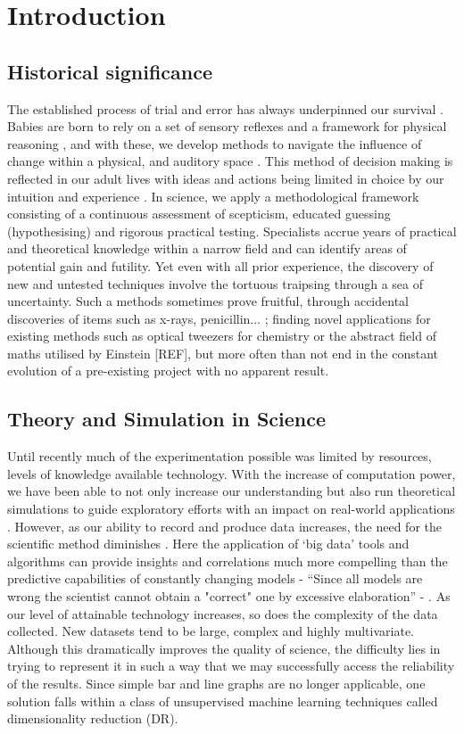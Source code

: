 
\section{Introduction}

\subsection*{Historical significance}
The established process of trial and error has always underpinned our survival \citep{TrialandError}. Babies are born to rely on a set of sensory reflexes and a framework for physical reasoning \citep{pr}, and with these, we develop methods to navigate the influence of change within a physical, and auditory space \citep{objects}. This method of decision making is reflected in our adult lives with ideas and actions being limited in choice by our intuition and experience \citep{descartes}. In science, we apply a methodological framework consisting of a continuous assessment of scepticism, educated guessing (hypothesising) and rigorous practical testing. Specialists accrue years of practical and theoretical knowledge within a narrow field and can identify areas of potential gain and futility. Yet even with all prior experience, the discovery of new and untested techniques involve the tortuous traipsing through a sea of uncertainty. Such a methods sometimes prove fruitful, through accidental discoveries of items such as x-rays, penicillin... \citep{accidental}; finding novel applications for existing methods such as optical tweezers for chemistry or the abstract field of maths utilised by Einstein [REF], but more often than not end in the constant evolution of a pre-existing project with no apparent result. 

\subsection*{Theory and Simulation in Science}

Until recently much of the experimentation possible was limited by resources, levels of knowledge available technology. With the increase of computation power, we have been able to not only increase our understanding but also run theoretical simulations to guide exploratory efforts with an impact on real-world applications \citep{dft,lion,theoreticalbio,drug}. However, as our ability to record and produce data increases, the need for the scientific method diminishes \citep{wired}. Here the application of `big data' tools and algorithms can provide insights and correlations much more compelling than the predictive capabilities of constantly changing models - ``Since all models are wrong the scientist cannot obtain
a "correct" one by excessive elaboration'' - \cite{allmodels}. As our level of attainable technology increases, so does the complexity of the data collected. New datasets tend to be large, complex and highly multivariate. Although this dramatically improves the quality of science, the difficulty lies in trying to represent it in such a way that we may successfully access the reliability of the results. Since simple bar and line graphs are no longer applicable, one solution falls within a class of unsupervised machine learning techniques called dimensionality reduction (DR).


